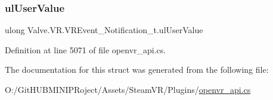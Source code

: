 \mbox{\label{struct_valve_1_1_v_r_1_1_v_r_event___notification__t_a96745266660383895c654a5d8906d75a}} 
\subsubsection{\texorpdfstring{ulUserValue}{ulUserValue}}
{\footnotesize\ttfamily ulong Valve.\+V\+R.\+V\+R\+Event\+\_\+\+Notification\+\_\+t.\+ul\+User\+Value}



Definition at line 5071 of file openvr\+\_\+api.\+cs.



The documentation for this struct was generated from the following file\+:\begin{DoxyCompactItemize}
\item 
O\+:/\+Git\+H\+U\+B\+M\+I\+N\+I\+P\+Roject/\+Assets/\+Steam\+V\+R/\+Plugins/\mbox{\hyperlink{openvr__api_8cs}{openvr\+\_\+api.\+cs}}\end{DoxyCompactItemize}
